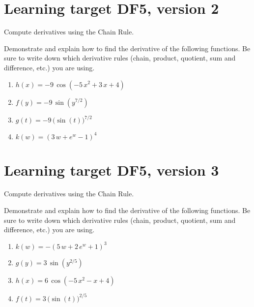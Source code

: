 \pagebreak

\section{Learning target DF5, version 2}

Compute derivatives using the Chain Rule.

\hrulefill

Demonstrate and explain how to find the derivative of the following functions. Be sure to write down which derivative rules (chain, product, quotient, sum and difference, etc.) you are using.

\begin{enumerate}
    \item \(h(x)= -9 \, \cos\left(-5 \, x^{2} + 3 \, x + 4\right)\)
    \vfill
    \item \(f(y)= -9 \, \sin\left(y^{7/2}\right)\)
    \vfill
    \item \(g(t)= -9 \, \Big(\sin\left(t\right)\Big)^{7/2}\)
    \vfill
    \item \(k(w)= {\left(3 \, w + e^{w} - 1\right)}^{4}\)
    \vfill
\end{enumerate}

\pagebreak

\section{Learning target DF5, version 3}

Compute derivatives using the Chain Rule.

\hrulefill

Demonstrate and explain how to find the derivative of the following functions. Be sure to write down which derivative rules (chain, product, quotient, sum and difference, etc.) you are using.

\begin{enumerate}
    \item \(k(w)= -{\left(5 \, w + 2 \, e^{w} + 1\right)}^{3}\)
    \vfill
    \item \(g(y)= 3 \, \sin\left(y^{2/5}\right)\)
    \vfill
    \item \(h(x)= 6 \, \cos\left(-5 \, x^{2} - x + 4\right)\)
    \vfill
    \item \(f(t)= 3 \, \Big(\sin\left(t\right)\Big)^{2/5}\)
    \vfill
\end{enumerate}

